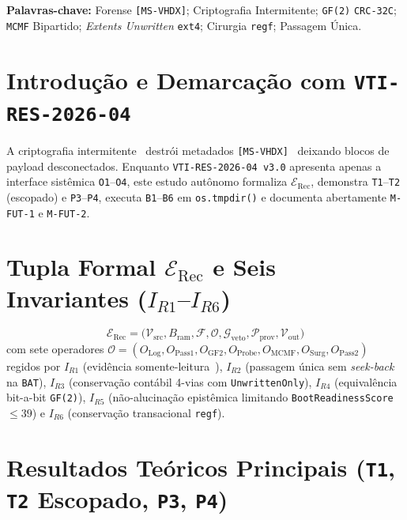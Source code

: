 \documentclass[10pt,twocolumn]{article}
\begin{document}
\vspace{0.4em}
\noindent\textbf{Palavras-chave:} Forense \texttt{[MS-VHDX]}; Criptografia Intermitente; \texttt{GF(2)} \texttt{CRC-32C}; \texttt{MCMF} Bipartido; \emph{Extents Unwritten} \texttt{ext4}; Cirurgia \texttt{regf}; Passagem \'{U}nica.

\section{Introdu\c{c}\~{a}o e Demarca\c{c}\~{a}o com \texttt{VTI-RES-2026-04}}

A criptografia intermitente~\cite{R07,R08,R09} destr\'{o}i metadados \texttt{[MS-VHDX]}~\cite{R16} deixando blocos de payload desconectados. Enquanto \texttt{VTI-RES-2026-04 v3.0} apresenta apenas a interface sist\^{e}mica \texttt{O1}--\texttt{O4}, este estudo aut\^{o}nomo formaliza $\mathcal{E}_{\mathrm{Rec}}$, demonstra \texttt{T1}--\texttt{T2} (escopado) e \texttt{P3}--\texttt{P4}, executa \texttt{B1}--\texttt{B6} em \texttt{os.tmpdir()} e documenta abertamente \texttt{M-FUT-1} e \texttt{M-FUT-2}.

\section{Tupla Formal $\mathcal{E}_{\mathrm{Rec}}$ e Seis Invariantes ($I_{R1}$--$I_{R6}$)}

\begin{equation}
\mathcal{E}_{\mathrm{Rec}} = \bigl(\mathcal{V}_{\mathrm{src}}, B_{\mathrm{ram}}, \mathcal{F}, \mathcal{O}, \mathcal{G}_{\mathrm{veto}}, \mathcal{P}_{\mathrm{prov}}, \mathcal{V}_{\mathrm{out}}\bigr)
\end{equation}
com sete operadores $\mathcal{O} = (O_{\mathrm{Log}}, O_{\mathrm{Pass1}}, O_{\mathrm{GF2}}, O_{\mathrm{Probe}}, O_{\mathrm{MCMF}}, O_{\mathrm{Surg}}, O_{\mathrm{Pass2}})$ regidos por $I_{R1}$ (evid\^{e}ncia somente-leitura~\cite{R15}), $I_{R2}$ (passagem \'{u}nica sem \emph{seek-back} na \texttt{BAT}), $I_{R3}$ (conserva\c{c}\~{a}o cont\'{a}bil 4-vias com \texttt{UnwrittenOnly}), $I_{R4}$ (equival\^{e}ncia bit-a-bit \texttt{GF(2)}), $I_{R5}$ (n\~{a}o-alucina\c{c}\~{a}o epist\^{e}mica limitando \texttt{BootReadinessScore} $\le 39$) e $I_{R6}$ (conserva\c{c}\~{a}o transacional \texttt{regf}).

\section{Resultados Te\'{o}ricos Principais (\texttt{T1}, \texttt{T2} Escopado, \texttt{P3}, \texttt{P4})}
\end{document}
